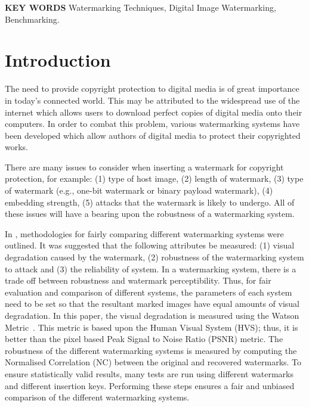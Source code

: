 \documentclass[10pt,twocolumn]{article}
\begin{document}
\noindent
{\bf\normalsize KEY WORDS}\newline
{Watermarking Techniques, Digital Image Watermarking, Benchmarking.}

\section{Introduction}
The need to provide copyright protection to digital media is of great importance in today's connected world.
This may be attributed to the widespread use of the internet which allows users to download perfect
copies of digital media onto their computers. In order to combat this problem, various watermarking systems
have been developed which allow 
authors of digital media to protect their
copyrighted works. 

There are many issues to consider when inserting a watermark for copyright protection, for example: (1) type of host image, (2) length of watermark,
(3) type of watermark (e.g., one-bit watermark or binary payload watermark), (4) embedding strength, (5) 
attacks that the watermark is likely to undergo. All of these issues will have a bearing upon the robustness of
a watermarking system.

In \cite{ECCb4:book, petit99}, methodologies for fairly comparing different
watermarking systems were outlined. 
It was suggested that the following attributes be measured: (1) visual degradation caused by the watermark,
(2) robustness of the watermarking system to attack and (3) the reliability of system.
In a watermarking system, there is a trade off between robustness and watermark perceptibility. Thus, for fair
evaluation and comparison of different systems, the parameters of each system need to be set so that the resultant
marked images have equal amounts of visual degradation. In this paper, the visual degradation is measured
using the Watson Metric~\cite{watson1Pap, watson2Pap, volo2nd}. This metric is based upon the Human
Visual System (HVS); thus, it is better than the pixel based Peak Signal to Noise Ratio (PSNR) metric.
The robustness of the different watermarking systems is measured by computing the Normalised Correlation (NC)
between the original and recovered watermarks.
To ensure statistically valid results, many tests are run using different watermarks and different insertion keys.
Performing these steps ensures a fair and unbiased comparison of the different watermarking systems.
\end{document}
